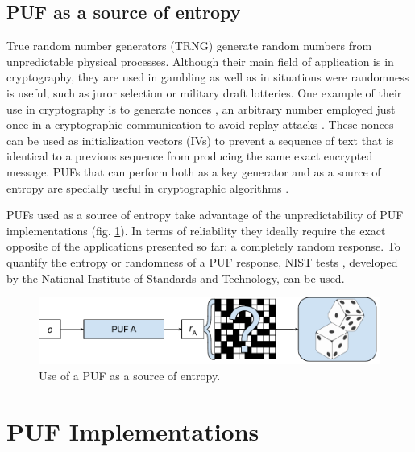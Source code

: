 
\subsection{PUF as a source of entropy}
\label{ss:entropy}
True random number generators (TRNG) generate random numbers from unpredictable physical processes. Although their main field of application is in cryptography, they are used in gambling as well as in situations were randomness is useful, such as juror selection or military draft lotteries. One example of their use in cryptography is to generate nonces \cite{Alioto2019}, an arbitrary number employed just once in a cryptographic communication to avoid replay attacks \cite{Martinez-Rodriguez2018}. These nonces can be used as initialization vectors (IVs) to prevent a sequence of text that is identical to a previous sequence from producing the same exact encrypted message. PUFs that can perform both as a key generator and as a source of entropy are specially useful in cryptographic algorithms \cite{Holcomb2009,Baturone2015}. 

PUFs used as a source of entropy take advantage of the unpredictability of PUF implementations (fig. \ref{fig:dice}). In terms of reliability they ideally require the exact opposite of the applications presented so far: a completely random response. To quantify the entropy or randomness of a PUF response, NIST tests \cite{Rukhin2010}, developed by the National Institute of Standards and Technology, can be used. 

\vspace{0.5cm}

\begin{figure}[H]
    \centering
    \includegraphics[width=15cm]{images/RNG.pdf}
    \caption{Use of a PUF as a source of entropy.}
    \label{fig:dice}
\end{figure}



\section{PUF Implementations}
\label{sec:implementations}


